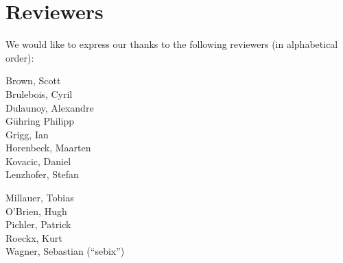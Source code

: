 \newpage
\section{Reviewers}
\label{section:Reviewers}

We would like to express our thanks to the following reviewers (in alphabetical order):


\vline{}

\begin{minipage}[b]{0.5\linewidth}
\center
Brown, Scott \\
Brulebois, Cyril \\
Dulaunoy, Alexandre \\
G\"uhring Philipp  \\
Grigg, Ian  \\
Horenbeck, Maarten \\
Kovacic, Daniel \\
Lenzhofer, Stefan \\
\end{minipage}
\begin{minipage}[b]{0.5\linewidth}
\center
Millauer, Tobias \\
O'Brien, Hugh \\
Pichler, Patrick \\
Roeckx, Kurt \\
Wagner, Sebastian (``sebix'') \\
\end{minipage}




